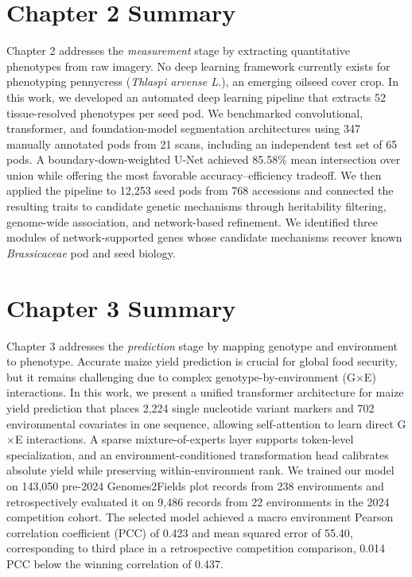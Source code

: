 \section*{Chapter 2 Summary}
Chapter 2 addresses the \textit{measurement} stage by extracting quantitative phenotypes from raw imagery. No deep learning framework currently exists for phenotyping pennycress (\textit{Thlaspi arvense L.}), an emerging oilseed cover crop. In this work, we developed an automated deep learning pipeline that extracts 52 tissue-resolved phenotypes per seed pod. We benchmarked convolutional, transformer, and foundation-model segmentation architectures using 347 manually annotated pods from 21 scans, including an independent test set of 65 pods. A boundary-down-weighted U-Net achieved 85.58\% mean intersection over union while offering the most favorable accuracy--efficiency tradeoff. We then applied the pipeline to 12,253 seed pods from 768 accessions and connected the resulting traits to candidate genetic mechanisms through heritability filtering, genome-wide association, and network-based refinement. We identified three modules of network-supported genes whose candidate mechanisms recover known \textit{Brassicaceae} pod and seed biology.

\section*{Chapter 3 Summary}\label{sec:ch3}
Chapter 3 addresses the \textit{prediction} stage by mapping genotype and environment to phenotype. Accurate maize yield prediction is crucial for global food security, but it remains challenging due to complex genotype-by-environment (G$\times$E) interactions. In this work, we present a unified transformer architecture for maize yield prediction that places 2,224 single nucleotide variant markers and 702 environmental covariates in one sequence, allowing self-attention to learn direct G$\times$E interactions. A sparse mixture-of-experts layer supports token-level specialization, and an environment-conditioned transformation head calibrates absolute yield while preserving within-environment rank. We trained our model on 143,050 pre-2024 Genomes2Fields plot records from 238 environments and retrospectively evaluated it on 9,486 records from 22 environments in the 2024 competition cohort. The selected model achieved a macro environment Pearson correlation coefficient (PCC) of 0.423 and mean squared error of 55.40, corresponding to third place in a retrospective competition comparison, 0.014 PCC below the winning correlation of 0.437.

